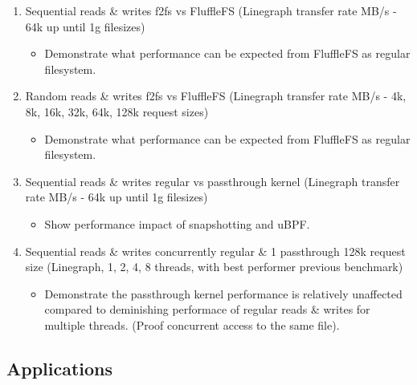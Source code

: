 \begin{enumerate}
    \item Sequential reads \& writes f2fs vs FluffleFS
    (Linegraph transfer rate MB/s - 64k up until 1g filesizes)
    \begin{itemize}
        \item Demonstrate what performance can be expected from FluffleFS as
              regular filesystem.
    \end{itemize}
    \item Random reads \& writes f2fs vs FluffleFS
    (Linegraph transfer rate MB/s - 4k, 8k, 16k, 32k, 64k, 128k request sizes)
    \begin{itemize}
        \item Demonstrate what performance can be expected from FluffleFS as
              regular filesystem.
    \end{itemize}
    \item Sequential reads \& writes regular vs passthrough kernel
    (Linegraph transfer rate MB/s - 64k up until 1g filesizes)
    \begin{itemize}
        \item Show performance impact of snapshotting and uBPF.
    \end{itemize}
    \item Sequential reads \& writes concurrently regular \& 1 passthrough 128k
    request size
    (Linegraph, 1, 2, 4, 8 threads, with best performer previous benchmark)
    \begin{itemize}
        \item Demonstrate the passthrough kernel performance is relatively
              unaffected compared to deminishing performace of regular reads
              \& writes for multiple threads. (Proof concurrent access to the
              same file).
    \end{itemize}
\end{enumerate}

\subsection{Applications}

